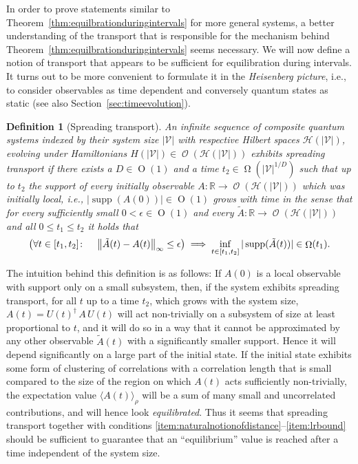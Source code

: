 \documentclass[a4paper,12pt,listof=totoc,index=totoc,bibliography=totoc,headsepline=false,headings=normal,BCOR16.153846mm,DIV12,headinclude,twoside,cleardoublepage=empty,numbers=noenddot,final]{scrreprt}
\theoremstyle{mystyle}
\numberwithin{equation}{section}
\numberwithin{figure}{section}
\numberwithin{lemma}{section}
\numberwithin{theorem}{section}
\numberwithin{corollary}{section}
\newtheorem{definition}{Definition}
\numberwithin{definition}{section}
\numberwithin{conjecture}{section}
\numberwithin{observation}{section}
\newcommand{\+}{\mkern2mu}
\newcommand{\oftype}{\colon}
\newcommand{\itholds}{\colon\mathchoice{\quad}{}{}{}}
\renewcommand{\H}{H}
\newcommand{\Vset}{\mathcal{V}}
\newcommand{\ex}[2]{\langle #1 \rangle_{#2}}
\newcommand{\norm}[2][]{
  \ifthenelse{\equal{#1}{}}
    {\left\| {#2} \right\|}
    {\ifthenelse{\equal{#1}{uinv}}
      {\left\vert\kern-0.25ex\left\vert\kern-0.25ex\left\vert {#2} \right\vert\kern-0.25ex\right\vert\kern-0.25ex\right\vert}
      {\left\| {#2} \right\|_{#1}}
    }
}
\DeclareMathOperator{\landauO}{O}
\DeclareMathOperator{\landauOmega}{\Omega}
\newcommand{\ad}{^\dagger}
\DeclareMathOperator{\1}{\mathds{1}}
\DeclareMathOperator{\Obs}{\mathcal{O}}
\DeclareMathOperator{\supp}{supp}
\newcommand{\mc}[1]{\mathcal{#1}}
\newcommand{\mcH}{\mc{H}}
\newcommand{\mb}[1]{\mathbb{#1}}
\newcommand{\R}{\mb{R}}
\begin{document}
In order to prove statements similar to Theorem~\ref{thm:equilbrationduringintervals} for more general systems, a better understanding of the transport that is responsible for the mechanism behind Theorem~\ref{thm:equilbrationduringintervals} seems necessary.
We will now define a notion of transport that appears to be sufficient for equilibration during intervals.
It turns out to be more convenient to formulate it in the \emph{Heisenberg picture}, i.e., to consider observables as time dependent and conversely quantum states as static (see also Section~\ref{sec:timeevolution}).
\begin{definition}[Spreading transport] \label{def:mixingtransport}
  An infinite sequence of composite quantum systems indexed by their system size $|\Vset|$ with respective Hilbert spaces $\mcH(|\Vset|)$, evolving under Hamiltonians $\H(|\Vset|) \in \Obs(\mcH(|\Vset|))$ exhibits \emph{spreading transport} if there exists a $D \in \landauO(1)$ and a time $t_2 \in \landauOmega(|\Vset|^{1/D})$ such that up to $t_2$ the support of every initially observable $A\oftype \R \to  \Obs(\mcH(|\Vset|))$ which was initially local, i.e., $|\supp(A(0))| \in \landauO(1)$ grows with time in the sense that for every sufficiently small $0<\epsilon \in \landauO(1)$ and every $\tilde{A}\oftype \R \to \Obs(\mcH(|\Vset|))$ and all $0 \leq t_1 \leq t_2$ it holds that
  \begin{equation}
    \left( \forall t \in [t_1,t_2]\itholds \norm[\infty]{\tilde{A}(t) - A(t)} \leq \epsilon \right) \implies \inf_{t \in [t_1,t_2]} |\supp(\tilde{A}(t))| \in \landauOmega(t_1) .
  \end{equation}
\end{definition}

The intuition behind this definition is as follows:
If $A(0)$ is a local observable with support only on a small subsystem, then, if the system exhibits spreading transport, for all $t$ up to a time $t_2$, which grows with the system size, $A(t) = U(t)\ad\,A\,U(t)$ will act non-trivially on a subsystem of size at least proportional to $t$, and it will do so in a way that it cannot be approximated by any other observable $\tilde{A}(t)$ with a significantly smaller support.
Hence it will depend significantly on a large part of the initial state.
If the initial state exhibits some form of clustering of correlations with a correlation length that is small compared to the size of the region on which $A(t)$ acts sufficiently non-trivially, the expectation value $\ex{A(t)}{\rho}$ will be a sum of many small and uncorrelated contributions, and will hence look \emph{equilibrated}.
Thus it seems that spreading transport together with conditions \ref{item:naturalnotionofdistance}--\ref{item:lrbound} should be sufficient to guarantee that an ``equilibrium'' value is reached after a time independent of the system size.
\end{document}
